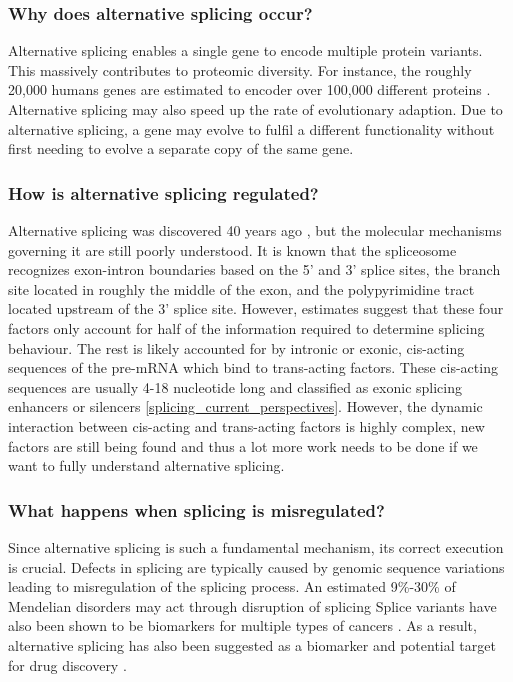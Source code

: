 \subsubsection{Why does alternative splicing occur?}
Alternative splicing enables a single gene to encode multiple protein variants. This massively contributes to proteomic diversity. For instance, the roughly 20,000 humans genes are estimated to encoder over 100,000 different proteins \cite{splicing_current_perspectives}.\\ 
Alternative splicing may also speed up the rate of evolutionary adaption. Due to alternative splicing, a gene may evolve to fulfil a different functionality without first needing to evolve a separate copy of the same gene. \cite{bretschneiderphdthesis}
\subsubsection{How is alternative splicing regulated?}
Alternative splicing was discovered 40 years ago \cite{discoveryofsplicing}, but the molecular mechanisms governing it are still poorly understood. It is known that the spliceosome recognizes exon-intron boundaries based on the 5' and 3' splice sites, the branch site located in roughly the middle of the exon, and the polypyrimidine tract located upstream of the 3' splice site. However, estimates suggest that these four factors only account for half of the information required to determine splicing behaviour. The rest is likely accounted for by intronic or exonic, cis-acting sequences of the pre-mRNA which bind to trans-acting factors. These cis-acting sequences are usually 4-18 nucleotide long and classified as exonic splicing enhancers or silencers \ref{splicing_current_perspectives}.
However, the dynamic interaction between cis-acting and trans-acting factors is highly complex, new factors are still being found and thus a lot more work needs to be done if we want to fully understand alternative splicing.

\subsubsection{What happens when splicing is misregulated?}
Since alternative splicing is such a fundamental mechanism, its correct execution is crucial. Defects in splicing are typically caused by genomic sequence variations leading to misregulation of the splicing process. An estimated 9\%-30\% of Mendelian disorders may act through disruption of splicing \cite{comparison}
Splice variants have also been shown to be biomarkers for multiple types of cancers \cite{cancer}. As a result, alternative splicing has also been suggested as a biomarker and potential target for drug discovery \cite{drugdiscoverysplicing}. \\


